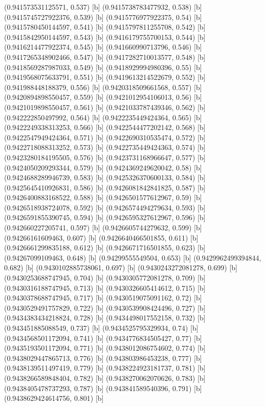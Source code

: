 {{{(0.941573531125571, 0.537) [b] 
(0.9415738783477932, 0.538) [b] 
(0.9415745727922376, 0.539) [b] 
(0.9415776977922375, 0.54) [b] 
(0.9415780450144597, 0.541) [b] 
(0.9415797811255708, 0.542) [b] 
(0.9415842950144597, 0.543) [b] 
(0.9416179755700153, 0.544) [b] 
(0.9416214477922374, 0.545) [b] 
(0.941660990713796, 0.546) [b] 
(0.9417265348902466, 0.547) [b] 
(0.9417282710013577, 0.548) [b] 
(0.9418569287987033, 0.549) [b] 
(0.9418929994980396, 0.55) [b] 
(0.9419568075633791, 0.551) [b] 
(0.9419613214522679, 0.552) [b] 
(0.941988448188379, 0.556) [b] 
(0.9420318509661568, 0.557) [b] 
(0.9420894898550457, 0.559) [b] 
(0.9421012954106013, 0.56) [b] 
(0.9421019898550457, 0.561) [b] 
(0.9421033787439346, 0.562) [b] 
(0.942222850497992, 0.564) [b] 
(0.9422235449424364, 0.565) [b] 
(0.9422249338313253, 0.566) [b] 
(0.9422544477202142, 0.568) [b] 
(0.9422547949424364, 0.571) [b] 
(0.9422690310535474, 0.572) [b] 
(0.9422718088313252, 0.573) [b] 
(0.9422735449424363, 0.574) [b] 
(0.9423280184195505, 0.576) [b] 
(0.9423731168966647, 0.577) [b] 
(0.9424050209293344, 0.579) [b] 
(0.9424369249620042, 0.58) [b] 
(0.9424688289946739, 0.583) [b] 
(0.9425326370600133, 0.584) [b] 
(0.9425645410926831, 0.586) [b] 
(0.9426081842841825, 0.587) [b] 
(0.9426400883168522, 0.588) [b] 
(0.9426501577612967, 0.59) [b] 
(0.9426518938724078, 0.592) [b] 
(0.9426574494279634, 0.593) [b] 
(0.9426591855390745, 0.594) [b] 
(0.9426595327612967, 0.596) [b] 
(0.942660227205741, 0.597) [b] 
(0.9426605744279632, 0.599) [b] 
(0.94266161609463, 0.607) [b] 
(0.9426640466501855, 0.611) [b] 
(0.9426661299835188, 0.612) [b] 
(0.9426671716501855, 0.623) [b] 
(0.94267099109463, 0.648) [b] 
(0.94299555549504, 0.653) [b] 
(0.9429962499394844, 0.682) [b] 
(0.9430102885738061, 0.697) [b] 
(0.9430243272081278, 0.699) [b] 
(0.9430253688747945, 0.704) [b] 
(0.9430305772081278, 0.709) [b] 
(0.9430316188747945, 0.713) [b] 
(0.9430326605414612, 0.715) [b] 
(0.9430378688747945, 0.717) [b] 
(0.9430519075091162, 0.72) [b] 
(0.9430529491757829, 0.722) [b] 
(0.9430539908424496, 0.727) [b] 
(0.9434383434218824, 0.728) [b] 
(0.9434498017552158, 0.732) [b] 
(0.943451885088549, 0.737) [b] 
(0.9434525795329934, 0.74) [b] 
(0.9434568501172094, 0.741) [b] 
(0.9434776834505427, 0.77) [b] 
(0.9435193501172094, 0.771) [b] 
(0.9438012086754602, 0.774) [b] 
(0.9438029447865713, 0.776) [b] 
(0.943803986453238, 0.777) [b] 
(0.9438139511497419, 0.779) [b] 
(0.9438224923181737, 0.781) [b] 
(0.9438266589848404, 0.782) [b] 
(0.9438270062070626, 0.783) [b] 
(0.9438405478737293, 0.787) [b] 
(0.943841589540396, 0.791) [b] 
(0.9438629424614756, 0.801) [b] 
}}}
